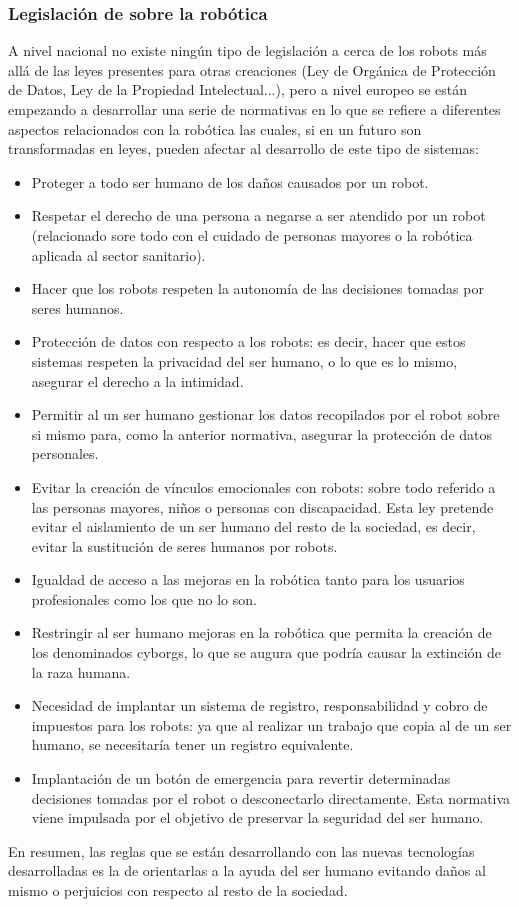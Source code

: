 \subsubsection{Legislación de sobre la robótica}
A nivel nacional no existe ningún tipo de legislación a cerca de los robots más allá de las leyes presentes para otras creaciones (Ley de Orgánica de Protección de Datos, Ley de la Propiedad Intelectual...), pero a nivel europeo se están empezando a desarrollar una serie de normativas en lo que se refiere a diferentes aspectos relacionados con la robótica las cuales, si en un futuro son transformadas en leyes, pueden afectar al desarrollo de este tipo de sistemas:
\begin{itemize}
	\item Proteger a todo ser humano de los daños causados por un robot.
	\item Respetar el derecho de una persona a negarse a ser atendido por un robot (relacionado sore todo con el cuidado de personas mayores o la robótica aplicada al sector sanitario).
	\item Hacer que los robots respeten la autonomía de las decisiones tomadas por seres humanos.
	\item Protección de datos con respecto a los robots: es decir, hacer que estos sistemas respeten la privacidad del ser humano, o lo que es lo mismo, asegurar el derecho a la intimidad.
	\item Permitir al un ser humano gestionar los datos recopilados por el robot sobre si mismo para, como la anterior normativa, asegurar la protección de datos personales.
	\item Evitar la creación de vínculos emocionales con robots: sobre todo referido a las personas mayores, niños o personas con discapacidad. Esta ley pretende evitar el aislamiento de un ser humano del resto de la sociedad, es decir, evitar la sustitución de seres humanos por robots.
	\item Igualdad de acceso a las mejoras en la robótica tanto para los usuarios profesionales como los que no lo son.
	\item Restringir al ser humano mejoras en la robótica que permita la creación de los denominados cyborgs, lo que se augura que podría causar la extinción de la raza humana.
	\item Necesidad de implantar un sistema de registro, responsabilidad y cobro de impuestos para los robots: ya que al realizar un trabajo que copia al de un ser humano, se necesitaría tener un registro equivalente.
	\item Implantación de un botón de emergencia para revertir determinadas decisiones tomadas por el robot o desconectarlo directamente. Esta normativa viene impulsada por el objetivo de preservar la seguridad del ser humano.
\end{itemize}
En resumen, las reglas que se están desarrollando con las nuevas tecnologías desarrolladas es la de orientarlas a la ayuda del ser humano evitando daños al mismo o perjuicios con respecto al resto de la sociedad.